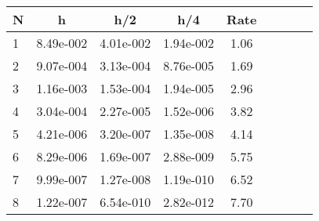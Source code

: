 \begin{tabular}{lcccccccc}
N & h & h/2 & h/4 & Rate\\
\hline
1& 8.49e-002& 4.01e-002& 1.94e-002& 1.06\\
2& 9.07e-004& 3.13e-004& 8.76e-005& 1.69\\
3& 1.16e-003& 1.53e-004& 1.94e-005& 2.96\\
4& 3.04e-004& 2.27e-005& 1.52e-006& 3.82\\
5& 4.21e-006& 3.20e-007& 1.35e-008& 4.14\\
6& 8.29e-006& 1.69e-007& 2.88e-009& 5.75\\
7& 9.99e-007& 1.27e-008& 1.19e-010& 6.52\\
8& 1.22e-007& 6.54e-010& 2.82e-012& 7.70\\
\hline
\end{tabular}
